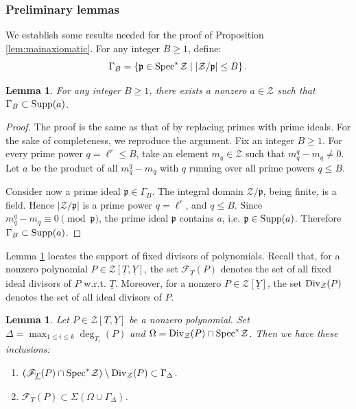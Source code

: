 \documentclass[11pt,a4paper,reqno]{amsart}
\newtheorem{lem}[thm]{Lemma}
\theoremstyle{definition}
\begin{document}
\subsubsection{Preliminary lemmas} 
We establish some results needed for the proof of Proposition \ref{lem:mainaxiomatic}. For any integer $B \geq 1$, define: 
$$
\Gamma_B=\left\lbrace \mathfrak{p} \in {\rm Spec}^\ast\hskip 1pt\mathcal{Z}\mid |\mathcal{Z}/\mathfrak{p}| \leq B \right\rbrace.
$$
\begin{lem}\label{lem:interrestgen}
For any integer $B \geq 1$, there exists a nonzero $a \in \mathcal{Z}$ such that $\Gamma_B \subset {\rm Supp}(a)$. 
\end{lem}
\begin{proof}
The proof is the same as that of \cite[Lemma 3.9]{BDKN22} by replacing primes with prime ideals. For the sake of completeness, we reproduce the argument. Fix an integer $B\geq 1$. For every prime power $q=\ell^r \leq B$, take an element $m_q \in \mathcal{Z}$ such that $m_q^q-m_q \neq 0$. Let $a$ be the product
of all $m_q^q-m_q$ with $q$ running over all prime powers $q \leq B$. 

Consider now a prime ideal $\mathfrak{p} \in \Gamma_B$. The integral domain $\mathcal{Z}/\mathfrak{p}$, being
finite, is a field. Hence $|\mathcal{Z}/\mathfrak{p}|$ is a prime power $q=\ell^r$, and $q \leq B$. Since $m_q^q-m_q \equiv 0 \pmod{\mathfrak{p}}$, the prime ideal $\mathfrak{p}$ contains $a$, i.e. $\mathfrak{p} \in {\rm Supp}(a)$. Therefore $\Gamma_B \subset {\rm Supp}(a)$.
\end{proof}
Lemma \ref{lem:zero} locates the support of fixed divisors of polynomials. Recall that, for a nonzero polynomial $P \in \mathcal{Z}[\underline{T},\underline{Y}]$, the set $\mathcal{F}_{\underline{T}}(P)$ denotes the set of all fixed ideal divisors of $P$ \hbox{w.r.t.} $\underline{T}$. Moreover, for a nonzero $P \in \mathcal{Z}[\underline{Y}]$, the set ${\rm Div}_{\mathcal{Z}}(P)$ denotes the set of all ideal divisors of $P$.
\begin{lem}\label{lem:zero}
Let $P \in \mathcal{Z}[\underline{T},\underline{Y}]$ be a nonzero polynomial. Set $\Delta=\max_{1 \leq i \leq k}\deg_{T_i}(P)$ and $\Omega={\rm Div}_{\mathcal{Z}}(P) \cap {\rm Spec}^\ast\hskip 1pt \mathcal{Z}$. Then we have these inclusions: 
\begin{enumerate}
\item $(\mathscr{F}_{\underline{T}}(P) \cap {\rm Spec}^\ast\hskip 1pt \mathcal{Z}) \setminus {\rm Div}_{\mathcal{Z}}(P) \subset \Gamma_{\Delta}$. \label{lem:zeropart1}
\item $\mathscr{F}_{\underline{T}}(P) \subset \Sigma(\Omega \cup \Gamma_{\Delta})$.  \label{lem:zeropart2}
\end{enumerate}
\end{lem}
\end{document}
